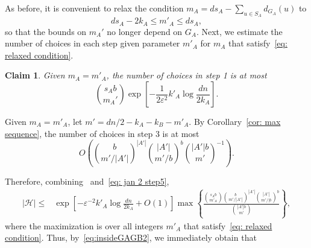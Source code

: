 \documentclass[11pt]{article}
\newcommand{\eps}{\varepsilon}
\newenvironment{proofclaim}[1][]%
{\noindent \emph{Proof.} {}{#1}{}}{\hfill
	$\Diamond$\vspace{1em}}
\theoremstyle{plain}
\newtheorem{claim}{Claim}[thm]
\begin{document}
As before, it is convenient to relax the condition $m_A = ds_A - \sum_{u \in S_A} d_{G_A}(u)$ to 
\begin{equation}\label{eq: relaxed condition}
    ds_A - 2k_A \leq m'_A \leq ds_A,
\end{equation}
so that the bounds on $m_A'$ no longer depend on $G_A$.
 Next, we estimate the number of choices in each step given parameter $m'_A$ for $m_A$ that satisfy~\eqref{eq: relaxed condition}.

\begin{claim}\label{clm: janson 2 step 2}
Given $m_A = m'_A$, the number of choices in step 1 is at most
\[
     {s_Ab \choose m_A'}\exp\left[-\frac{1}{2\eps^2} k'_A \log\frac{dn}{2k_A}\right].
    \]
\end{claim}




Given $m_A = m'_A$, let $m' = dn/2 - k_A - k_B - m'_A$. By Corollary~\ref{cor: max sequence}, the number of choices in step 3 is at most
\begin{equation}
O\left(\binom{b}{m'/|A'|}^{|A'|}\binom{|A'|}{m'/b}^{b}\binom{|A'|b}{m'}^{-1}\right). \label{eq: jan 2 step5}
\end{equation}

Therefore, combining~  and~\eqref{eq: jan 2 step5},
\begin{align*}
|{\mathcal H}| \le &\exp\left[-\eps^{-2}k'_A\log\frac{dn}{2k_A} + O(1) \right]\max\left\{\frac{\binom{s_Ab}{m'_A}\binom{b}{m'/|A'|}^{|A'|}\binom{|A'|}{m'/|b}^{b}}                {\binom{|A'|b}{m'}}\right\},
\end{align*} 
where the maximization is over all integers $m'_A$ that satisfy~\eqref{eq: relaxed condition}. Thus, by~\eqref{eq:insideGAGB2}, we immediately obtain that 
\end{document}
